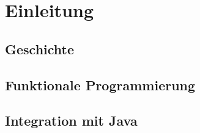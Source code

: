 \section{Einleitung}

\subsection{Geschichte}

\subsection{Funktionale Programmierung}

\subsection{Integration mit Java}
